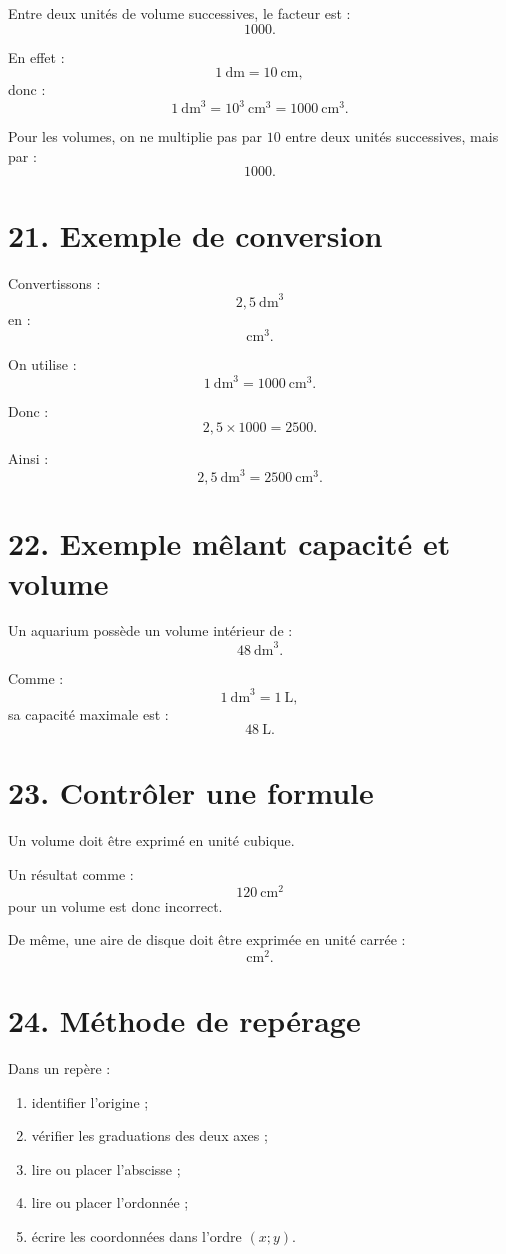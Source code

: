 Entre deux unités de volume successives, le facteur est :
\[
1000.
\]

En effet :
\[
1\ \text{dm}=10\ \text{cm},
\]
donc :
\[
1\ \text{dm}^3
=
10^3\ \text{cm}^3
=
1000\ \text{cm}^3.
\]

\begin{attention}
Pour les volumes, on ne multiplie pas par $10$ entre deux unités successives, mais par :
\[
1000.
\]
\end{attention}

\section{21. Exemple de conversion}

Convertissons :
\[
2{,}5\ \text{dm}^3
\]
en :
\[
\text{cm}^3.
\]

On utilise :
\[
1\ \text{dm}^3=1000\ \text{cm}^3.
\]

Donc :
\[
2{,}5\times1000=2500.
\]

Ainsi :
\[
\boxed{2{,}5\ \text{dm}^3=2500\ \text{cm}^3}.
\]

\section{22. Exemple mêlant capacité et volume}

Un aquarium possède un volume intérieur de :
\[
48\ \text{dm}^3.
\]

Comme :
\[
1\ \text{dm}^3=1\ \text{L},
\]
sa capacité maximale est :
\[
\boxed{48\ \text{L}}.
\]

\section{23. Contrôler une formule}

Un volume doit être exprimé en unité cubique.

Un résultat comme :
\[
120\ \text{cm}^2
\]
pour un volume est donc incorrect.

De même, une aire de disque doit être exprimée en unité carrée :
\[
\text{cm}^2.
\]

\section{24. Méthode de repérage}

\begin{methode}
Dans un repère :
\begin{enumerate}
\item identifier l'origine ;
\item vérifier les graduations des deux axes ;
\item lire ou placer l'abscisse ;
\item lire ou placer l'ordonnée ;
\item écrire les coordonnées dans l'ordre $(x;y)$.
\end{enumerate}
\end{methode}

